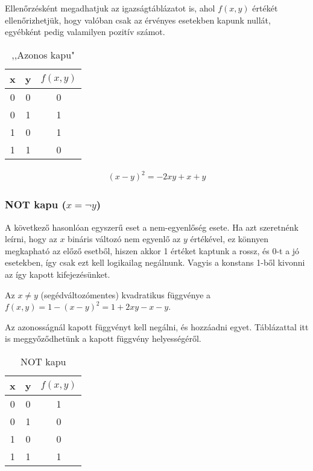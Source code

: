 	Ellenőrzésként megadhatjuk az igazságtáblázatot is, ahol $f(x,y)$ értékét ellenőrizhetjük, hogy valóban csak az érvényes esetekben kapunk nullát, egyébként pedig valamilyen pozitív számot.
	\begin{table}[ht]
		\footnotesize
		\centering
		\begin{tabular}{ c c c }
			\toprule
			x & y & $f(x,y)$ \\
			\midrule
			0 & 0 & 0 \\
			0 & 1 & 1 \\
			1 & 0 & 1 \\
			1 & 1 & 0 \\		
			\bottomrule
		\end{tabular}
		\caption{,,Azonos kapu"}
		\label{tab:SAMEgate}
	\end{table}	



\begin{align}
	(x-y)^2=-2xy+x+y
\end{align}



\subsubsection{NOT kapu ($x= \neg y$)}

A következő hasonlóan egyszerű eset a nem-egyenlőség esete. Ha azt szeretnénk leírni, hogy az $x$ bináris változó nem egyenlő az $y$ értékével, ez könnyen megkapható az előző esetből, hiszen akkor 1 értéket kaptunk a rossz, és 0-t a jó esetekben, így csak ezt kell logikailag negálnunk. Vagyis a konstans 1-ből kivonni az így kapott kifejezésünket.

\begin{allitas}
	Az $x \neq y$ (segédváltozómentes) kvadratikus függvénye a $f(x,y)=1-(x-y)^2=1+2xy-x-y$.
	
	Az azonosságnál kapott függvényt kell negálni, és hozzáadni egyet. Táblázattal itt is meggyőződhetünk a kapott függvény helyességéről.
\end{allitas}

	\begin{table}[ht]
		\footnotesize
		\centering
		\begin{tabular}{ c c c }
			\toprule
			x & y & $f(x,y)$ \\
			\midrule
			0 & 0 & 1 \\
			0 & 1 & 0 \\
			1 & 0 & 0 \\
			1 & 1 & 1 \\		
			\bottomrule
		\end{tabular}
		\caption{NOT kapu}
		\label{tab:NOTgate}
	\end{table}	


